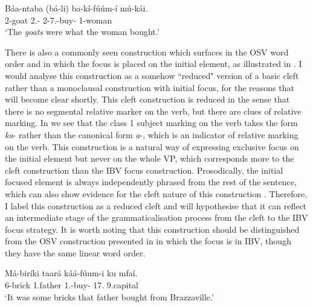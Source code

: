 \documentclass[output=paper,colorlinks,citecolor=brown,
]{langscibook}
\begin{document}
\begin{exe}
\ex
\label{141}
\gll
Báa-ntaba (bá-li) ba-kí-fúúm-í mú-kái.\\
2-goat {\db}2\Sm{}.\Pst{}-\Cop{} 2\Rel{}-7\Sm{}.\Pst{}-buy-\Pst{} 1-woman\\
\trans ‘The \textit{goats} were what the woman bought.’ \\

\end{exe}
There is also a commonly seen construction which surfaces in the OSV word order and in which the focus is placed on the initial element, as illustrated in . I would analyse this construction as a somehow ``reduced" version of a basic cleft rather than a monoclausal construction with initial focus, for the reasons that will become clear shortly. This cleft construction is reduced in the sense that there is no segmental relative marker on the verb, but there are clues of relative marking. In  we see that the class 1 subject marking on the verb takes the form \textit{ka}- rather than the canonical form \textit{a}-, which is an indicator of relative marking on the verb. This construction is a natural way of expressing exclusive focus on the initial element but never on the whole VP, which corresponds more to the cleft construction than the IBV focus construction. Prosodically, the initial focused element is always independently phrased from the rest of the sentence, which can also show evidence for the cleft nature of this construction \citep{ChengDowning2013}. Therefore, I label this construction as a reduced cleft and will hypothesise that it can reflect an intermediate stage of the grammaticalisation process from the cleft to the IBV focus strategy. It is worth noting that this construction should be distinguished from the OSV construction presented in  in which the focus is in IBV, though they have the same linear word order.
\begin{exe}
\ex
\label{142}
\gll
Má-biríki taará káá-fúum-i ku mfaí.\\
6-brick 1.father 1\Sm{}.\Pst{}-buy-\Pst{} 17.\Loc{} 9.capital \\
\trans ‘It was some bricks that father bought from Brazzaville.’

\end{exe}
\end{document}
